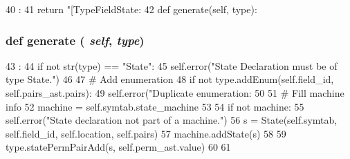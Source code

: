 \begin{DoxyCode}
40                       :
41         return "[TypeFieldState: %
42 
    def generate(self, type):
\end{DoxyCode}
\hypertarget{classslicc_1_1ast_1_1TypeFieldStateAST_1_1TypeFieldStateAST_a4555d1cee0dccf3942ea35fe86de2e8e}{
\subsubsection[{generate}]{\setlength{\rightskip}{0pt plus 5cm}def generate ( {\em self}, \/   {\em type})}}
\label{classslicc_1_1ast_1_1TypeFieldStateAST_1_1TypeFieldStateAST_a4555d1cee0dccf3942ea35fe86de2e8e}



\begin{DoxyCode}
43                             :
44         if not str(type) == "State":
45             self.error("State Declaration must be of type State.")
46         
47         # Add enumeration
48         if not type.addEnum(self.field_id, self.pairs_ast.pairs):
49             self.error("Duplicate enumeration: %
50 
51         # Fill machine info
52         machine = self.symtab.state_machine
53 
54         if not machine:
55             self.error("State declaration not part of a machine.")
56         s = State(self.symtab, self.field_id, self.location, self.pairs)
57         machine.addState(s)
58 
59         type.statePermPairAdd(s, self.perm_ast.value)
60 
61 

\end{DoxyCode}


